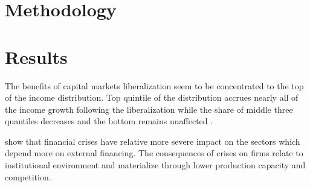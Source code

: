 \documentclass[a4paper,11pt]{article}
\begin{document}






%
%
\section{Methodology}

\section{Results}
The benefits of capital markets liberalization seem to be concentrated to the top of the income distribution. Top quintile of the distribution accrues nearly all of the income growth following the liberalization while the share of middle three quantiles decreases and the bottom remains unaffected \citep{das2003income}.

\citet{kroszneretal2007} show that financial crises have relative more severe impact on the sectors which depend more on external financing. The consequences of crises on firms relate to institutional environment and materialize through lower production capacity and competition.
\end{document}
